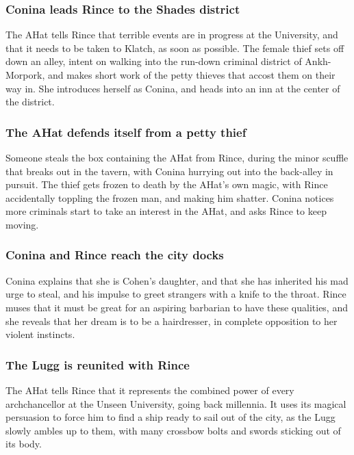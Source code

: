 \subsubsection{\Gls{Conina} leads \Gls{Rince} to the Shades district}
The \Gls{AHat} tells \Gls{Rince} that terrible events are in progress at the University, and that
it needs to be taken to Klatch, as soon as possible. The female thief sets off down an alley,
intent on walking into the run-down criminal district of Ankh-Morpork, and makes short work of
the petty thieves that accost them on their way in. She introduces herself as \Gls{Conina}, and
heads into an inn at the center of the district.

\subsubsection{The \Gls{AHat} defends itself from a petty thief}
Someone steals the box containing the \Gls{AHat} from \Gls{Rince}, during the minor scuffle that
breaks out in the tavern, with \Gls{Conina} hurrying out into the back-alley in pursuit. The thief
gets frozen to death by the \Gls{AHat}'s own magic, with \Gls{Rince} accidentally toppling the
frozen man, and making him shatter. \Gls{Conina} notices more criminals start to take an interest
in the \Gls{AHat}, and asks \Gls{Rince} to keep moving.

\subsubsection{\Gls{Conina} and \Gls{Rince} reach the city docks}
\Gls{Conina} explains that she is \Gls{Cohen}'s daughter, and that she has inherited his mad urge
to steal, and his impulse to greet strangers with a knife to the throat. \Gls{Rince} muses that it
must be great for an aspiring barbarian to have these qualities, and she reveals that her dream is
to be a hairdresser, in complete opposition to her violent instincts.

\subsubsection{The \Gls{Lugg} is reunited with \Gls{Rince}}
The \Gls{AHat} tells \Gls{Rince} that it represents the combined power of every archchancellor at
the Unseen University, going back millennia. It uses its magical persuasion to force him to find a
ship ready to sail out of the city, as the \Gls{Lugg} slowly ambles up to them, with many crossbow
bolts and swords sticking out of its body.

